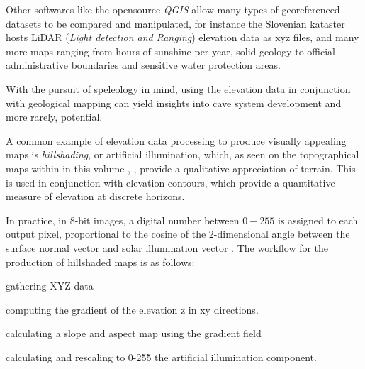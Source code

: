 Other softwares like the opensource \emph{QGIS} allow many types of georeferenced datasets to be compared and manipulated, for instance the Slovenian kataster hosts LiDAR (\emph{Light detection and Ranging}) elevation data as xyz files, and many more maps ranging from hours of sunshine per year, solid geology to official administrative boundaries and sensitive water protection areas. 

With the pursuit of speleology in mind, using the elevation data in conjunction with geological mapping can yield insights into cave system development and more rarely, potential. 

A common example of elevation data processing to produce visually appealing maps is \emph{hillshading}, or artificial illumination, which, as seen on the topographical maps within in this volume , , provide a qualitative appreciation of terrain. This is used in conjunction with elevation contours, which provide a quantitative measure of elevation at discrete horizons. 

In practice, in 8-bit images, a digital number between $0-255$ is assigned to each output pixel, proportional to the cosine of the 2-dimensional angle between the surface normal vector and solar illumination vector \citep{corripio2003vectorial}. The workflow for the production of hillshaded maps is as follows:
\begin{citemize}
\item gathering XYZ data
\item computing the gradient of the elevation z in xy directions.
\item calculating a slope and aspect map using the gradient field
\item calculating and rescaling to 0-255 the artificial illumination component.
\end{citemize}

